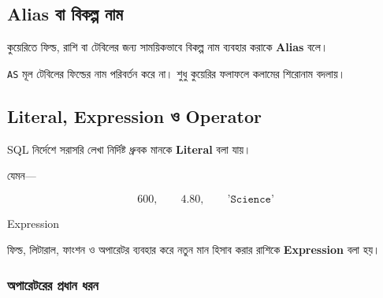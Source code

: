 \subsection{Alias বা বিকল্প নাম}

\begin{definitionbox}{}

কুয়েরিতে ফিল্ড, রাশি বা টেবিলের জন্য সাময়িকভাবে
বিকল্প নাম ব্যবহার করাকে \textbf{Alias} বলে।

\end{definitionbox}

\noindent\par\smallskip

\texttt{AS} মূল টেবিলের ফিল্ডের নাম পরিবর্তন করে না। শুধু কুয়েরির ফলাফলে কলামের শিরোনাম বদলায়।

\subsection{Literal, Expression ও Operator}

\begin{definitionbox}{}

SQL নির্দেশে সরাসরি লেখা নির্দিষ্ট ধ্রুবক মানকে
\textbf{Literal} বলা যায়।

\end{definitionbox}

যেমন—

\[
600,
\qquad
4.80,
\qquad
\texttt{'Science'}
\]

\begin{definitionbox}{Expression}

ফিল্ড, লিটারাল, ফাংশন ও অপারেটর ব্যবহার করে নতুন মান
হিসাব করার রাশিকে \textbf{Expression} বলা হয়।

\end{definitionbox}

\noindent\par\smallskip



\subsubsection{অপারেটরের প্রধান ধরন}

